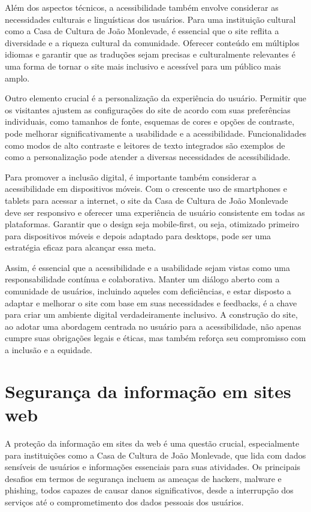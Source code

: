 Além dos aspectos técnicos, a acessibilidade também envolve considerar as necessidades culturais e linguísticas dos usuários. Para uma instituição cultural como a Casa de Cultura de João Monlevade, é essencial que o site reflita a diversidade e a riqueza cultural da comunidade. Oferecer conteúdo em múltiplos idiomas e garantir que as traduções sejam precisas e culturalmente relevantes é uma forma de tornar o site mais inclusivo e acessível para um público mais amplo.

Outro elemento crucial é a personalização da experiência do usuário. Permitir que os visitantes ajustem as configurações do site de acordo com suas preferências individuais, como tamanhos de fonte, esquemas de cores e opções de contraste, pode melhorar significativamente a usabilidade e a acessibilidade. Funcionalidades como modos de alto contraste e leitores de texto integrados são exemplos de como a personalização pode atender a diversas necessidades de acessibilidade.

Para promover a inclusão digital, é importante também considerar a acessibilidade em dispositivos móveis. Com o crescente uso de smartphones e tablets para acessar a internet, o site da Casa de Cultura de João Monlevade deve ser responsivo e oferecer uma experiência de usuário consistente em todas as plataformas. Garantir que o design seja mobile-first, ou seja, otimizado primeiro para dispositivos móveis e depois adaptado para desktops, pode ser uma estratégia eficaz para alcançar essa meta.

Assim, é essencial que a acessibilidade e a usabilidade sejam vistas como uma responsabilidade contínua e colaborativa. Manter um diálogo aberto com a comunidade de usuários, incluindo aqueles com deficiências, e estar disposto a adaptar e melhorar o site com base em suas necessidades e feedbacks, é a chave para criar um ambiente digital verdadeiramente inclusivo. A construção do site, ao adotar uma abordagem centrada no usuário para a acessibilidade, não apenas cumpre suas obrigações legais e éticas, mas também reforça seu compromisso com a inclusão e a equidade.


\section{Segurança da informação em sites web}

A proteção da informação em sites da web é uma questão crucial, especialmente para instituições como a Casa de Cultura de João Monlevade, que lida com dados sensíveis de usuários e informações essenciais para suas atividades. Os principais desafios em termos de segurança incluem as ameaças de hackers, malware e phishing, todos capazes de causar danos significativos, desde a interrupção dos serviços até o comprometimento dos dados pessoais dos usuários.

